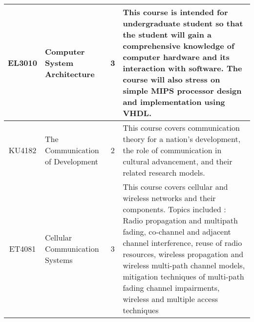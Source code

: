 \documentclass{article}
\begin{document}
\begin{center}
\begin{tabular}{ | c | B{5.4cm} | c | p{6.8cm} |}
            EL3010 & Computer System Architecture & 3 & This course is intended for undergraduate student so that the student will gain a comprehensive knowledge of computer hardware and its interaction with software. The course will also stress on simple MIPS processor design and implementation using VHDL. \\ \hline    
            
           KU4182 & The Communication of Development & 2 & This course covers communication theory for a nation's development, the role of communication in cultural advancement, and their related research models. \\ \hline
           
            ET4081 & Cellular Communication Systems & 3 & This course covers cellular and wireless networks and their components. Topics included : Radio propagation and multipath fading, co-channel and adjacent channel interference, reuse of radio resources, wireless propagation and wireless multi-path channel models, mitigation techniques of multi-path fading channel impairments, wireless and multiple access techniques  \\ \hline               
                                                    		                                                  
        \end{tabular}
    \end{center} 
    
    \newpage
    
    
\end{document}

